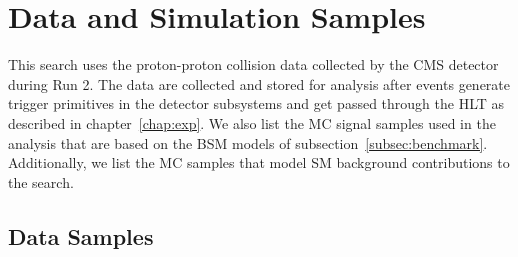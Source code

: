 
\section{Data and Simulation Samples}
\label{sec:samples}

This search uses the proton-proton collision data collected by the CMS detector during Run 2.
The data are collected and stored for analysis after events generate trigger primitives in the detector subsystems and get passed through the HLT as described in chapter~\ref{chap:exp}.
We also list the MC signal samples used in the analysis that are based on the BSM models of subsection~\ref{subsec:benchmark}.
Additionally, we list the MC samples that model SM background contributions to the search.

\subsection{Data Samples}

